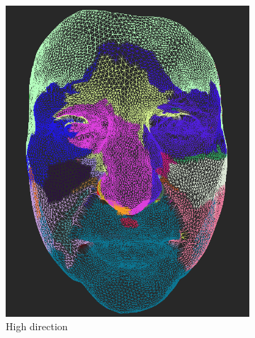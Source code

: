 \begin{figure}[h]
\centering
	\begin{subfigure}{0.4\textwidth}
	\includegraphics[width=\textwidth]{./img/meshdiff-high_direction.PNG}
	\caption{High direction}
	\label{fig:meshdiff-high_direction}
	\end{subfigure}
    \qquad
    \begin{subfigure}{0.4\textwidth}

\end{subfigure}
\end{figure}
